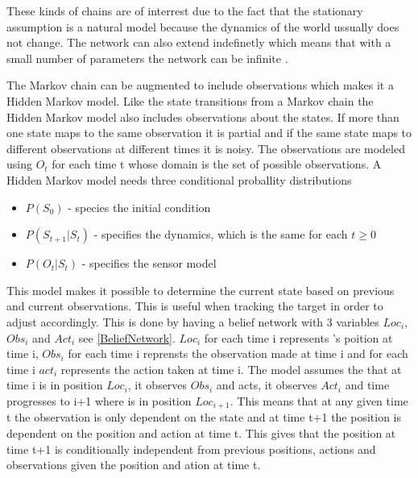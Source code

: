 These kinds of chains are of interrest due to the fact that the stationary
assumption is a natural model because the dynamics of the world ussually does
not change. The network can also extend indefinetly which means that with a
small number of parameters the network can be infinite \citep[Ch.
6.5.1]{MIBook}.\nl

The Markov chain can be augmented to include observations which makes it a
Hidden Markov model. Like the state transitions from a Markov chain the Hidden
Markov model also includes observations about the states. If more than one state
maps to the same observation it is partial and if the same state maps to
different observations at different times it is noisy. The observations are
modeled using $O_t$ for each time t whose domain is the set of possible
observations. A Hidden Markov model needs three conditional proballity
distributions \citep[6.5.2]{MIBook}
\begin{itemize}
  \item $P(S_0)$ - species the initial condition
  \item $P(S_{t+1}|S_t)$ - specifies the dynamics, which is the same for each $t
  \geq 0$
  \item $P(O_t|S_t)$ - specifies the sensor model
\end{itemize}

This model makes it possible to determine the current state based on previous
and current observations. This is useful when tracking the target in order to
adjust \namep accordingly. This is done by having a belief network with 3
variables $Loc_i$, $Obs_i$ and $Act_i$ see \autoref{BeliefNetwork}. $Loc_i$ for
each time i represents \name's poition at time i, $Obs_i$ for each time i reprensts the observation
made at time i and for each time i $act_i$ represents the action taken at time
i. The model assumes the that at time i \namep is in position $Loc_i$, it
observes $Obs_i$ and acts, it observes $Act_i$ and time progresses to i+1 where
\namep is in position $Loc_{i+1}$. This means that at any given time t the
observation is only dependent on the state and at time t+1 the position is
dependent on the position and action at time t. This gives that the position
at time t+1 is conditionally independent from previous positions, actions and
observations given the position and ation at time t. 


